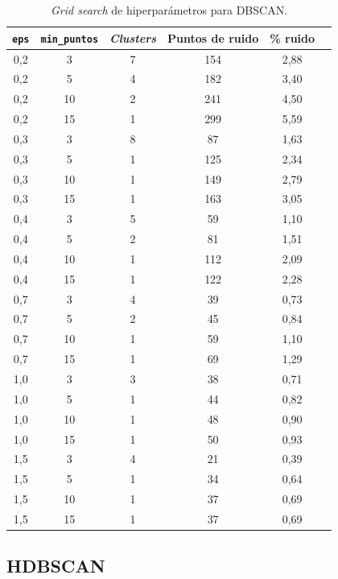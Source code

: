 \documentclass[a4paper,10pts,openany]{book}
\begin{document}
	\begin{table}[h]
		\centering
		\begin{tabular}{cccccc}
			\toprule
			\texttt{eps} & \texttt{min\_puntos} & \emph{Clusters} & Puntos de ruido & \% ruido \\
			\midrule
			0{,}2 & 3  & 7 & 154 & 2{,}88 \\
			0{,}2 & 5  & 4 & 182 & 3{,}40 \\
			0{,}2 & 10 & 2 & 241 & 4{,}50 \\
			0{,}2 & 15 & 1 & 299 & 5{,}59 \\
			0{,}3 & 3  & 8 & 87  & 1{,}63 \\
			0{,}3 & 5  & 1 & 125 & 2{,}34 \\
			0{,}3 & 10 & 1 & 149 & 2{,}79 \\
			0{,}3 & 15 & 1 & 163 & 3{,}05 \\
			0{,}4 & 3  & 5 & 59  & 1{,}10 \\
			0{,}4 & 5  & 2 & 81  & 1{,}51 \\
			0{,}4 & 10 & 1 & 112 & 2{,}09 \\
			0{,}4 & 15 & 1 & 122 & 2{,}28 \\
			0{,}7 & 3  & 4 & 39  & 0{,}73 \\
			0{,}7 & 5  & 2 & 45  & 0{,}84 \\
			0{,}7 & 10 & 1 & 59  & 1{,}10 \\
			0{,}7 & 15 & 1 & 69  & 1{,}29 \\
			1{,}0 & 3  & 3 & 38  & 0{,}71 \\
			1{,}0 & 5  & 1 & 44  & 0{,}82 \\
			1{,}0 & 10 & 1 & 48  & 0{,}90 \\
			1{,}0 & 15 & 1 & 50  & 0{,}93 \\
			1{,}5 & 3  & 4 & 21  & 0{,}39 \\
			1{,}5 & 5  & 1 & 34  & 0{,}64 \\
			1{,}5 & 10 & 1 & 37  & 0{,}69 \\
			1{,}5 & 15 & 1 & 37  & 0{,}69 \\
			\bottomrule
		\end{tabular}
		\caption{\emph{Grid search} de hiperparámetros para DBSCAN.}
		\label{tab:gridsearch-dbscan}
	\end{table}
	
	
	\subsection{HDBSCAN}
	
\end{document}
